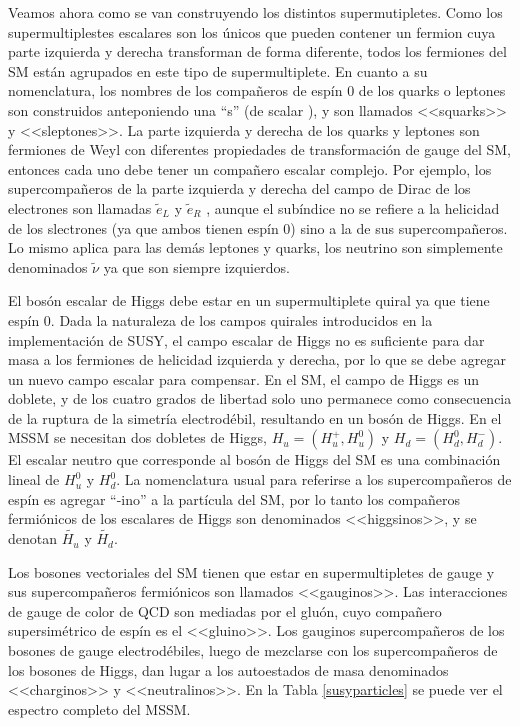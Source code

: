 Veamos ahora como se van construyendo los distintos supermutipletes. Como los supermultiplestes escalares son los únicos que pueden contener un fermion cuya parte izquierda y derecha transforman de forma diferente, todos los fermiones del SM están agrupados en este tipo de supermultiplete. En cuanto a su nomenclatura, los nombres de los compañeros de espín 0 de los quarks o leptones son construidos anteponiendo una “s” (de scalar ), y son llamados <<squarks>> y <<sleptones>>. La parte izquierda y derecha de los quarks y leptones son fermiones de Weyl con diferentes propiedades de transformación de gauge del SM, entonces cada uno debe tener un compañero escalar complejo. Por ejemplo, los supercompañeros de la parte izquierda y derecha del campo de Dirac de los electrones son llamadas $\tilde{e}_{L}$ y $\tilde{e}_{R}$ , aunque el subíndice no se refiere a la helicidad de los slectrones (ya que ambos tienen espín 0) sino a la de sus supercompañeros. Lo mismo aplica para las demás leptones y quarks, los neutrino son simplemente denominados $\tilde{\nu}$ ya que son siempre izquierdos.

El bosón escalar de Higgs debe estar en un supermultiplete quiral ya que tiene espín 0. Dada la naturaleza de los campos quirales introducidos en la implementación de SUSY, el campo escalar de Higgs no es suficiente para dar masa a los fermiones de helicidad izquierda y derecha, por lo que se debe agregar un nuevo campo escalar para compensar. En el SM, el campo de Higgs es un doblete, y de los cuatro grados de libertad solo uno permanece como consecuencia de la ruptura de la simetría electrodébil, resultando en un bosón de Higgs. En el MSSM se necesitan dos dobletes de Higgs, $H_{u}=(H^{+}_{u},H^{0}_{u})$ y $H_{d}=(H^{0}_{d},H^{-}_{d})$. El escalar neutro que corresponde al bosón de Higgs del SM es una combinación lineal de $H^{0}_{u}$ y $H^{0}_{d}$. La nomenclatura usual para referirse a los supercompañeros de espín  es agregar “-ino” a la partícula del SM, por lo tanto los compañeros fermiónicos de los escalares de Higgs son denominados <<higgsinos>>, y se denotan $\widetilde{H_{u}}$ y $\widetilde{H_{d}}$.

Los bosones vectoriales del SM tienen que estar en supermultipletes de gauge y sus supercompañeros fermiónicos son llamados <<gauginos>>. Las interacciones de gauge de color de QCD son mediadas por el gluón, cuyo compañero supersimétrico de espín  es el <<gluino>>. Los gauginos supercompañeros de los bosones de gauge electrodébiles, luego de mezclarse con los supercompañeros de los bosones de Higgs, dan lugar a los autoestados de masa denominados <<charginos>> y <<neutralinos>>. En la Tabla \ref{susyparticles} se puede ver el espectro completo del MSSM.



